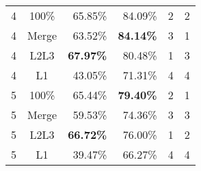 \begin{table}[]
\begin{tabular}{@{}ccrrcc@{}}
4       & 100\%                    & 65.85\%                    & 84.09\%                   & 2             & 2           \\
4       & Merge                    & 63.52\%                    & \textbf{84.14\%}          & 3             & 1           \\
4       & L2L3                     & \textbf{67.97\%}           & 80.48\%                   & 1             & 3           \\
4       & L1                       & 43.05\%                    & 71.31\%                   & 4             & 4           \\ \midrule
5       & 100\%                    & 65.44\%                    & \textbf{79.40\%}          & 2             & 1           \\
5       & Merge                    & 59.53\%                    & 74.36\%                   & 3             & 3           \\
5       & L2L3                     & \textbf{66.72\%}           & 76.00\%                   & 1             & 2           \\
5       & L1                       & 39.47\%                    & 66.27\%                   & 4             & 4           \\ \bottomrule
\end{tabular}
\caption{}
\label{tab:mead_cmp}
\end{table}


